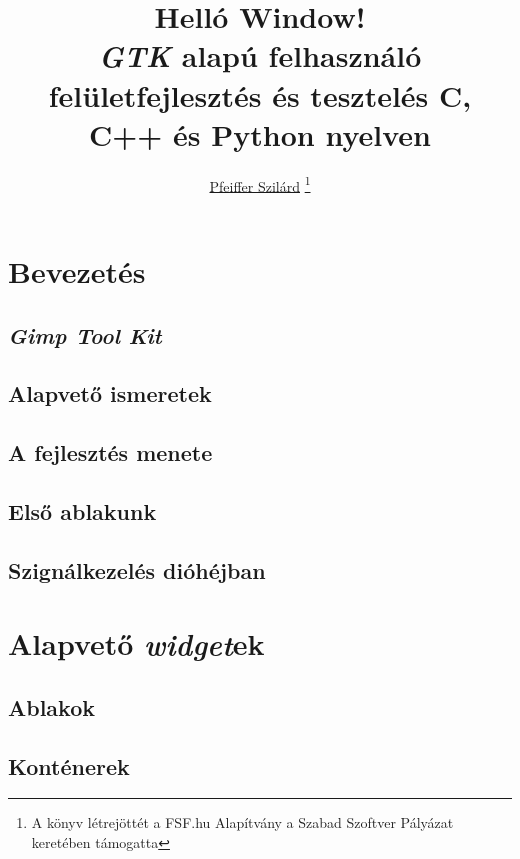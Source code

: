 \documentclass[a4paper, titlepage]{report}
\author{
\href{http://pfeifferszilard.hu}{Pfeiffer Szilárd}
\thanks{A könyv létrejöttét a FSF.hu Alapítvány a Szabad Szoftver Pályázat\cite{fsftender2011} keretében támogatta}
}
\title{
Helló Window!\\\medskip
\large{\textit{GTK} alapú felhasználó felületfejlesztés és tesztelés C, C++ és Python nyelven}
}
\begin{document}
\maketitle

\tableofcontents
\newpage
{}

\part{Bevezetés}

\chapter{\textit{Gimp Tool Kit}}


\chapter{Alapvető ismeretek}


\chapter{A fejlesztés menete}


\chapter{Első ablakunk}


\chapter{Szignálkezelés dióhéjban}


\part{Alapvető \textit{widget}ek}

\chapter{Ablakok}


\chapter{Konténerek}

\end{document}
